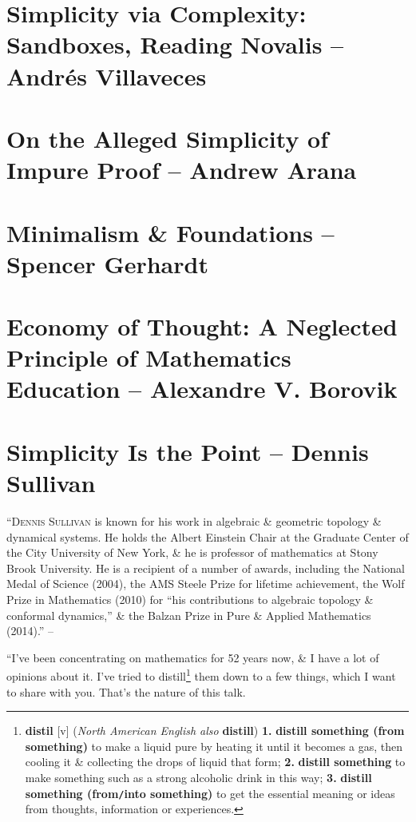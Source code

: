 \documentclass[oneside]{book}
\numberwithin{equation}{section}
\begin{document}
\section{Simplicity via Complexity: Sandboxes, Reading Novalis -- Andr\'es Villaveces}

\section{On the Alleged Simplicity of Impure Proof -- Andrew Arana}

\section{Minimalism \& Foundations -- Spencer Gerhardt}

\section{Economy of Thought: A Neglected Principle of Mathematics Education -- Alexandre V. Borovik}

\section{Simplicity Is the Point -- Dennis Sullivan}
``\textsc{Dennis Sullivan} is known for his work in algebraic \& geometric topology \& dynamical systems. He holds the Albert Einstein Chair at the Graduate Center of the City University of New York, \& he is professor of mathematics at Stony Brook University. He is a recipient of a number of awards, including the National Medal of Science (2004), the AMS Steele Prize for lifetime achievement, the Wolf Prize in Mathematics (2010) for ``his contributions to algebraic topology \& conformal dynamics,'' \& the Balzan Prize in Pure \& Applied Mathematics (2014).'' -- \cite[Contributors, p. xx ]{Kossak_Ording2017}

``I've been concentrating on mathematics for 52 years now, \& I have a lot of opinions about it. I've tried to distill\footnote{\textbf{distil} [v] (\textit{North American English also} \textbf{distill}) \textbf{1.} \textbf{distill something (from something)} to make a liquid pure by heating it until it becomes a gas, then cooling it \& collecting the drops of liquid that form; \textbf{2.} \textbf{distill something} to make something such as a strong alcoholic drink in this way; \textbf{3.} \textbf{distill something (from\texttt{/}into something)} to get the essential meaning or ideas from thoughts, information or experiences.} them down to a few things, which I want to share with you. That's the nature of this talk.
\end{document}

